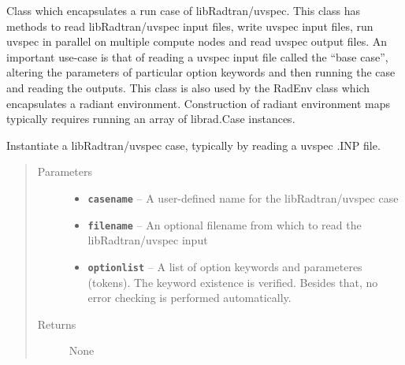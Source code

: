 \documentclass[a4paper,10pt,english]{sphinxmanual}
\begin{document}
\begin{fulllineitems}
\label{packages:librad.Case}
Class which encapsulates a run case of libRadtran/uvspec.
This class has methods to read libRadtran/uvspec input files, write uvspec input files, run uvspec in parallel on
multiple compute nodes and read uvspec output files. An important use-case is that of reading a uvspec input
file called the ``base case'', altering the parameters of particular option keywords and then running the case
and reading the outputs. This class is also used by the RadEnv class which encapsulates a radiant environment.
Construction of radiant environment maps typically requires running an array of librad.Case instances.

Instantiate a libRadtran/uvspec case, typically by reading a uvspec .INP file.
\begin{quote}\begin{description}
\item[{Parameters}] \leavevmode\begin{itemize}
\item {} 
\textbf{\texttt{casename}} -- A user-defined name for the libRadtran/uvspec case

\item {} 
\textbf{\texttt{filename}} -- An optional filename from which to read the libRadtran/uvspec input

\item {} 
\textbf{\texttt{optionlist}} -- A list of option keywords and parameteres (tokens). The keyword existence
is verified. Besides that, no error checking is performed automatically.

\end{itemize}

\item[{Returns}] \leavevmode
None

\end{description}\end{quote}


\end{fulllineitems}
\end{document}
